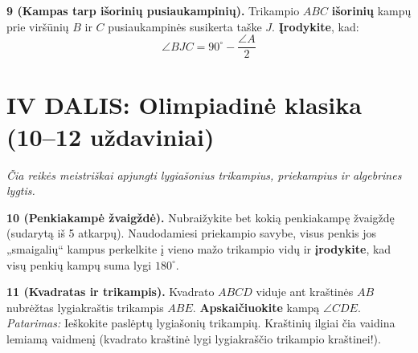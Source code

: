 \documentclass[11pt,a4paper]{scrartcl}
\begin{document}
\vspace{0.5cm}

\textbf{9 (Kampas tarp išorinių pusiaukampinių).} Trikampio \(ABC\) \textbf{išorinių} kampų prie viršūnių \(B\) ir \(C\) pusiaukampinės susikerta taške \(J\). \textbf{Įrodykite}, kad:
\begin{equation*}
\angle BJC = 90^\circ - \frac{\angle A}{2}
\end{equation*}

\newpage
\section*{IV DALIS: Olimpiadinė klasika (10–12 uždaviniai)}
\textit{Čia reikės meistriškai apjungti lygiašonius trikampius, priekampius ir algebrines lygtis.}

\textbf{10 (Penkiakampė žvaigždė).} Nubraižykite bet kokią penkiakampę žvaigždę (sudarytą iš 5 atkarpų). Naudodamiesi priekampio savybe, visus penkis jos „smaigalių“ kampus perkelkite į vieno mažo trikampio vidų ir \textbf{įrodykite}, kad visų penkių kampų suma lygi \(180^\circ\).
\begin{center}
\end{center}

\vspace{0.5cm}

\textbf{11 (Kvadratas ir trikampis).} Kvadrato \(ABCD\) viduje ant kraštinės \(AB\) nubrėžtas lygiakraštis trikampis \(ABE\). \textbf{Apskaičiuokite} kampą \(\angle CDE\).\\
\textit{Patarimas:} Ieškokite paslėptų lygiašonių trikampių. Kraštinių ilgiai čia vaidina lemiamą vaidmenį (kvadrato kraštinė lygi lygiakraščio trikampio kraštinei!).
\end{document}

